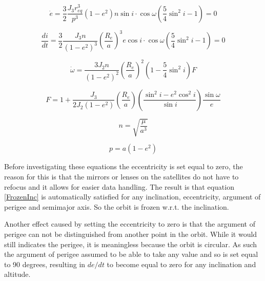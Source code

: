 
\begin{equation}
\dot e = \frac{3}
{2}\frac{{J_3 r_{eq}^3 }}
{{p^3 }}\left( {1 - e^2 } \right)n\sin i \cdot \cos \omega \left( {\frac{5}
{4}\sin ^2 i - 1} \right) = 0
\label{FrozenEcc}
\end{equation}

\begin{equation}
\frac{{di}}
{{dt}} = \frac{3}
{2}\frac{{J_3 n}}
{{\left( {1 - e^2 } \right)^3 }}\left( {\frac{{R_e }}
{a}} \right)^3 e\cos i \cdot \cos \omega \left( {\frac{5}
{4}\sin ^2 i - 1} \right) = 0
\label{FrozenInc}
\end{equation}

\begin{equation}
\dot \omega  = \frac{{3J_2 n}}
{{\left( {1 - e^2 } \right)^2 }}\left( {\frac{{R_e }}
{a}} \right)^2 \left( {1 - \frac{5}
{4}\sin ^2 i} \right)F
\label{FrozenArg}
\end{equation}

\begin{equation}
F = 1 + \frac{{J_3 }}
{{2J_2 \left( {1 - e^2 } \right)}}\left( {\frac{{R_e }}
{a}} \right)\left( {\frac{{\sin ^2 i - e^2 \cos ^2 i}}
{{\sin i}}} \right)\frac{{\sin \omega }}
{e}
\label{FrozenF}
\end{equation}

\begin{equation}
n = \sqrt {\frac{\mu }
{{a^3 }}} 
\label{meanMotion}
\end{equation}

\begin{equation}
p = a\left( {1 - e^2 } \right)
\label{p}
\end{equation}

Before investigating these equations the eccentricity is set equal to zero, the reason for this is that the mirrors or lenses on the satellites do not have to refocus and it allows for easier data handling.
The result is that equation \ref{FrozenInc} is automatically satisfied for any inclination, eccentricity, argument of perigee and semimajor axis. So the orbit is frozen w.r.t. the inclination.

Another effect caused by setting the eccentricity to zero is that the argument of perigee can not be distinguished from another point in the orbit. While it would still indicates the perigee, it is meaningless because the orbit is circular. As such the argument of perigee assumed to be able to take any value and so is set equal to 90 degrees, resulting in $de/dt$ to become equal to zero for any inclination and altitude.

